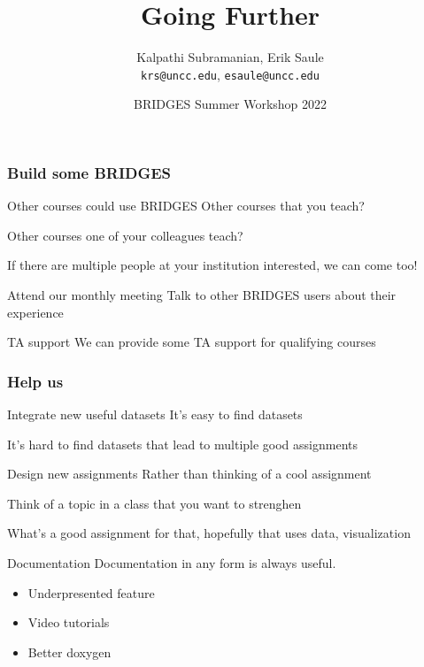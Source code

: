 \documentclass[aspectratio=169]{beamer}
\title{Going Further}
\subtitle{}
\author{Kalpathi Subramanian, Erik Saule\\\texttt{krs@uncc.edu}, \texttt{esaule@uncc.edu}}
\institute{The University of North Carolina at Charlotte}
\date{BRIDGES Summer Workshop 2022}
\begin{document}
\begin{frame}
\titlepage
\end{frame}




\begin{frame}
  \frametitle{Build some BRIDGES}
  \begin{block}{Other courses could use BRIDGES}
    Other courses that you teach?

    Other courses one of your colleagues teach?

    If there are multiple people at your institution interested, we can come too!
  \end{block}

  \begin{block}{Attend our monthly meeting}
    Talk to other BRIDGES users about their experience
  \end{block}

  \begin{block}{TA support}
    We can provide some TA support for qualifying courses
  \end{block}
\end{frame}

\begin{frame}
  \frametitle{Help us}
    \begin{block}{Integrate new useful datasets}
      It's easy to find datasets

      It's hard to find datasets that lead to multiple good assignments
    \end{block}

    \begin{block}{Design new assignments}
      Rather than thinking of a cool assignment

      Think of a topic in a class that you want to strenghen

      What's a good assignment for that, hopefully that uses data, visualization      
    \end{block}

    \begin{block}{Documentation}
      Documentation in any form is always useful.
      \begin{itemize}
      \item Underpresented feature
      \item Video tutorials
      \item Better doxygen
      \end{itemize}
    \end{block}
\end{frame}
\end{document}
